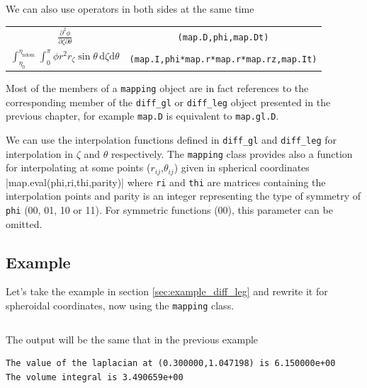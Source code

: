 We can also use operators in both sides at the same time

\medskip
\renewcommand{\arraystretch}{2} 
\begin{tabular}{c@{\quad:\quad}c}
$\displaystyle\frac{\partial^2\phi}{\partial\zeta\partial\theta}$&\verb|(map.D,phi,map.Dt)|\\
$\displaystyle
\int_{\eta_0}^{\eta_\mathrm{ndom.}}\int_0^\pi\phi r^2 r_\zeta\sin\theta\,\mathrm{d}\zeta\mathrm{d}\theta$&
\verb|(map.I,phi*map.r*map.r*map.rz,map.It)|\\
\end{tabular} 
\renewcommand{\arraystretch}{1} 
\medskip

Most of the members of a \verb|mapping| object are in fact references to the corresponding member of the
\verb|diff_gl| or \verb|diff_leg| object presented in the previous chapter, for example \verb|map.D| is
equivalent to \verb|map.gl.D|.

We can use the interpolation functions defined in \verb|diff_gl| and \verb|diff_leg| for interpolation in $\zeta$
and $\theta$ respectively. The \verb|mapping| class provides also a function for interpolating at 
some points ($r_{ij}$,$\theta_{ij}$) given in spherical coordinates
|map.eval(phi,ri,thi,parity)|
where \verb|ri| and \verb|thi| are matrices containing the interpolation points and parity is an integer
representing the type of symmetry of \verb|phi| (00, 01, 10 or 11). For symmetric functions (00), this parameter
can be omitted.

\subsection{Example}

Let's take the example in section \ref{sec:example_diff_leg} and rewrite it for spheroidal
coordinates, now using the \verb|mapping| class.

\inputminted[frame=single]{cpp}{../code_examples/mapping/example1.cpp}

The output will be the same that in the previous example

\begin{verbatim}
The value of the laplacian at (0.300000,1.047198) is 6.150000e+00
The volume integral is 3.490659e+00
\end{verbatim}





